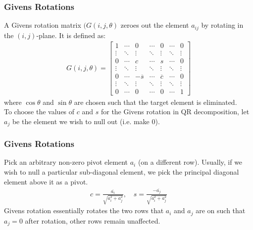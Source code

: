 \documentclass{beamer}
\theoremstyle{remark}
\numberwithin{equation}{section}
\begin{document}
      \begin{frame}
        \frametitle{Givens Rotations}


        A Givens rotation matrix $(G(i,j,\theta)$ zeroes out the element $a_{ij}$ by rotating in the $(i,j)$-plane. It is defined as:
        {\small
        \begin{align*}
          G(i, j, \theta) = \begin{bmatrix}
            1 & \cdots & 0 & \cdots & 0 & \cdots & 0 \\
            \vdots & \ddots & \vdots & \ddots & \vdots & \ddots & \vdots \\
            0 & \cdots & c & \cdots & s & \cdots & 0 \\
            \vdots & \ddots & \vdots & \ddots & \vdots & \ddots & \vdots \\
            0 & \cdots & -\overline{s} & \cdots & \overline{c} & \cdots & 0 \\
            \vdots & \ddots & \vdots & \ddots & \vdots & \ddots & \vdots \\
            0 & \cdots & 0 & \cdots & 0 & \cdots & 1
          \end{bmatrix}
        \end{align*}
        }
        where $\cos\theta$ and $\sin\theta$ are chosen such that the target element is eliminated.\\
      To choose the values of $c$ and $s$ for the Givens rotation in QR decomposition, let $a_j$ be the element we wish to null out (i.e. make 0).         \end{frame}
      \begin{frame}
        \frametitle{Givens Rotations}
        Pick an arbitrary non-zero pivot element $a_i$ (on a different row). Usually, if we wish to null a particular sub-diagonal element, we pick the principal diagonal element above it as a pivot.
        \begin{align*}
          c = \frac{\overline{a_{i}}}{\sqrt{a_{i}^2 + a_{j}^2}}, \quad s = \frac{-\overline{a_{j}}}{\sqrt{a_{i}^2 + a_{j}^2}}
        \end{align*}
        Givens rotation essentially rotates the two rows that $a_i$ and $a_j$ are on such that $a_j = 0$ after rotation, other rows remain unaffected. 

      \end{frame}
\end{document}
